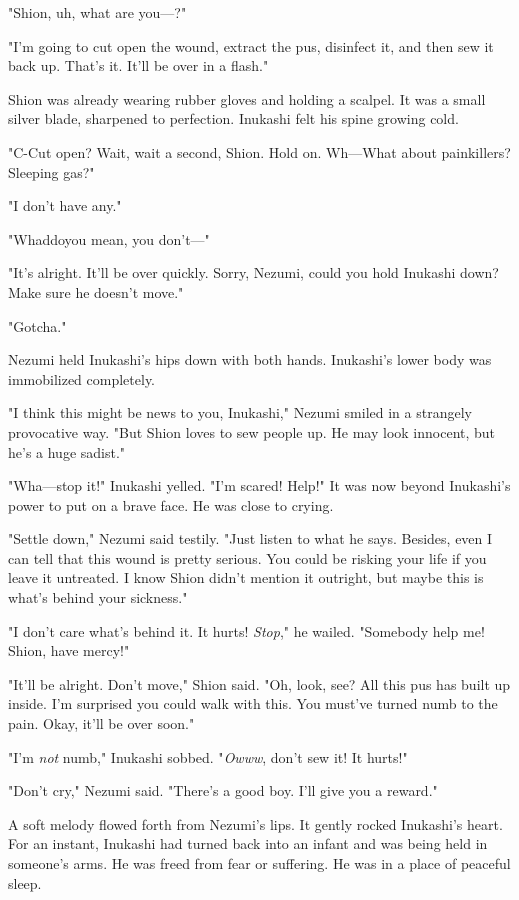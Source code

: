 "Shion, uh, what are you---?"

"I'm going to cut open the wound, extract the pus, disinfect it, and
then sew it back up. That's it. It'll be over in a flash."

Shion was already wearing rubber gloves and holding a scalpel. It was a
small silver blade, sharpened to perfection. Inukashi felt his spine
growing cold.

"C-Cut open? Wait, wait a second, Shion. Hold on. Wh---What about
painkillers? Sleeping gas?"

"I don't have any."

"Whaddoyou mean, you don't---"

"It's alright. It'll be over quickly. Sorry, Nezumi, could you hold
Inukashi down? Make sure he doesn't move."

"Gotcha."

Nezumi held Inukashi's hips down with both hands. Inukashi's lower body
was immobilized completely.

"I think this might be news to you, Inukashi," Nezumi smiled in a
strangely provocative way. "But Shion loves to sew people up. He may
look innocent, but he's a huge sadist."

"Wha---stop it!" Inukashi yelled. "I'm scared! Help!" It was now beyond
Inukashi's power to put on a brave face. He was close to crying.

"Settle down," Nezumi said testily. "Just listen to what he says.
Besides, even I can tell that this wound is pretty serious. You could be
risking your life if you leave it untreated. I know Shion didn't mention
it outright, but maybe this is what's behind your sickness."

"I don't care what's behind it. It hurts! \emph{Stop}," he wailed. "Somebody
help me! Shion, have mercy!"

"It'll be alright. Don't move," Shion said. "Oh, look, see? All this pus
has built up inside. I'm surprised you could walk with this. You must've
turned numb to the pain. Okay, it'll be over soon."

"I'm \emph{not} numb," Inukashi sobbed. "\emph{Owww}, don't sew it! It hurts!"

"Don't cry," Nezumi said. "There's a good boy. I'll give you a reward."

A soft melody flowed forth from Nezumi's lips. It gently rocked
Inukashi's heart. For an instant, Inukashi had turned back into an
infant and was being held in someone's arms. He was freed from fear or
suffering. He was in a place of peaceful sleep.

